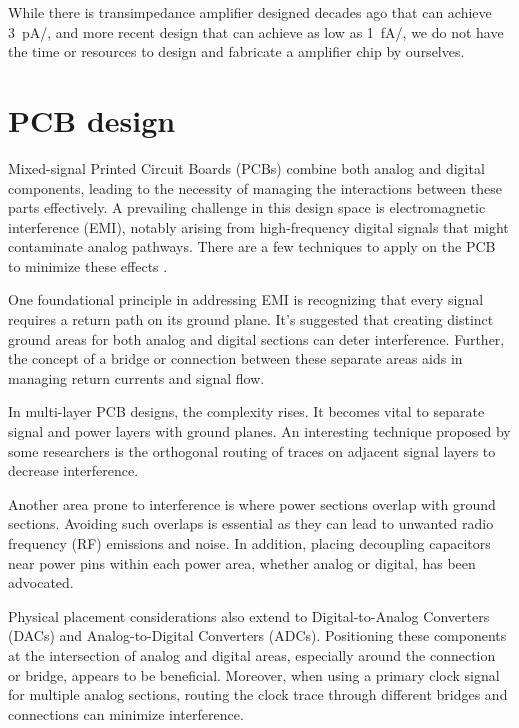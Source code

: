 While there is transimpedance amplifier \cite{TIA_1} designed decades ago that can achieve \qty{3}{pA/}, and more recent design \cite{TIA_2} \cite{TIA_3} that can achieve as low as \qty{1}{fA/}, we do not have the time or resources to design and fabricate a amplifier chip by ourselves.


\section{PCB design}

Mixed-signal Printed Circuit Boards (PCBs) combine both analog and digital components, leading to the necessity of managing the interactions between these parts effectively. A prevailing challenge in this design space is electromagnetic interference (EMI), notably arising from high-frequency digital signals that might contaminate analog pathways.  There are a few techniques to apply on the PCB to minimize these effects \cite{MixPCB} \cite{MixPCB_2} \cite{MixPCB_3}.

One foundational principle in addressing EMI is recognizing that every signal requires a return path on its ground plane. It's suggested that creating distinct ground areas for both analog and digital sections can deter interference. Further, the concept of a bridge or connection between these separate areas aids in managing return currents and signal flow.

In multi-layer PCB designs, the complexity rises. It becomes vital to separate signal and power layers with ground planes. An interesting technique proposed by some researchers is the orthogonal routing of traces on adjacent signal layers to decrease interference.

Another area prone to interference is where power sections overlap with ground sections. Avoiding such overlaps is essential as they can lead to unwanted radio frequency (RF) emissions and noise. In addition, placing decoupling capacitors near power pins within each power area, whether analog or digital, has been advocated.

Physical placement considerations also extend to Digital-to-Analog Converters (DACs) and Analog-to-Digital Converters (ADCs). Positioning these components at the intersection of analog and digital areas, especially around the connection or bridge, appears to be beneficial. Moreover, when using a primary clock signal for multiple analog sections, routing the clock trace through different bridges and connections can minimize interference.

